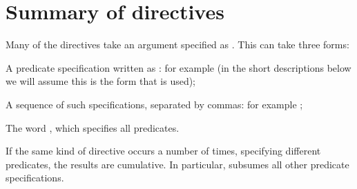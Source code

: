 \chapter*{Summary of directives\label{directives}}%

Many of the directives take an argument specified as .  This can
take three forms:
\begin{LightEnumerate}
\item
  A predicate specification written as : for example
   (in the short descriptions below we will assume this is the form
  that is used);
\item
  A sequence of such specifications, separated by commas: for example
  ;
\item
  The word , which specifies all predicates.
\end{LightEnumerate}
If the same kind of directive occurs a number of times, specifying different
predicates, the results are cumulative.  In particular,  subsumes all
other predicate specifications.

